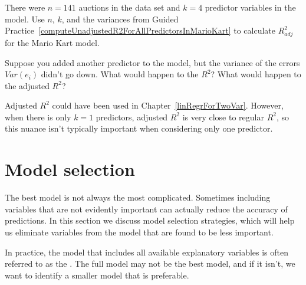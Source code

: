 \begin{exercisewrap}
\begin{nexercise}
There were $n=141$ auctions in the  data set and $k=4$ predictor variables in the model. Use $n$, $k$, and the variances from Guided Practice~\ref{computeUnadjustedR2ForAllPredictorsInMarioKart} to calculate $R_{adj}^2$ for the Mario Kart model.\footnotemark
\end{nexercise}
\end{exercisewrap}

\begin{exercisewrap}
\begin{nexercise}
Suppose you added another predictor to the model, but the variance of the errors $Var(e_i)$ didn't go down. What would happen to the $R^2$? What would happen to the adjusted $R^2$?\hspace{0.7mm}\footnotemark
\end{nexercise}
\end{exercisewrap}

Adjusted $R^2$ could have been used in Chapter~\ref{linRegrForTwoVar}. However, when there is only $k = 1$ predictors, adjusted $R^2$ is very close to regular $R^2$, so this nuance isn't typically important when considering only one predictor.






\section{Model selection}
\label{introductionToMultipleRegression}


\label{modelSelection}


The best model is not always the most complicated. Sometimes including variables that are not evidently important can actually reduce the accuracy of predictions. In this section we discuss model selection strategies, which will help us eliminate variables from the model that are found to be less important.

In practice, the model that includes all available explanatory variables is often referred to as the . The full model may not be the best model, and if it isn't, we want to identify a smaller model that is preferable.



